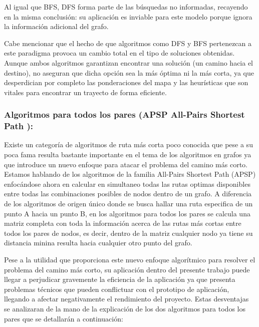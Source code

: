 \begin{itemize}
    Al igual que BFS, DFS forma parte de las búsquedas no informadas, recayendo en la misma conclusión: su aplicación es inviable para este modelo porque ignora la información adicional del grafo. 
    
    Cabe mencionar que el hecho de que algoritmos como DFS y BFS pertenezcan a este paradigma provoca un cambio total en el tipo de soluciones obtenidas. Aunque ambos algoritmos garantizan encontrar una solución (un camino hacia el destino), no aseguran que dicha opción sea la más óptima ni la más corta, ya que desperdician por completo las ponderaciones del mapa y las heurísticas que son vitales para encontrar un trayecto de forma eficiente.

\end{itemize}

\subsubsection{Algoritmos para todos los pares (APSP All-Pairs Shortest Path ):}

Existe un categoría de algoritmos de ruta más corta poco conocida que pese a su poca fama resulta bastante importante en el tema de los algoritmos en grafos ya que introduce un nuevo enfoque para atacar el problema del camino más corto. Estamos hablando de los algoritmos de la familia All-Pairs Shortest Path (APSP) enfocándose ahora en calcular en simultaneo todas las rutas optimas disponibles entre todas las combinaciones posibles de nodos dentro de un grafo. A diferencia de los algoritmos de origen único donde se busca hallar una ruta especifica de un punto A hacia un punto B, en los algoritmos para todos los pares se calcula una matriz completa con toda la información acerca de las rutas más cortas entre todos los pares de nodos, es decir, dentro de la matriz cualquier nodo ya tiene su distancia minina resulta hacia cualquier otro punto del grafo. 

Pese a la utilidad que proporciona este nuevo enfoque algorítmico para resolver el problema del camino más corto, su aplicación dentro del presente trabajo puede llegar a perjudicar gravemente la eficiencia de la aplicación ya que presenta problemas técnicos que pueden conflictuar con el prototipo de aplicación, llegando a afectar negativamente el rendimiento del proyecto. Estas desventajas se analizaran de la mano de la explicación de los dos algoritmos para todos los pares que se detallarán a continuación:

